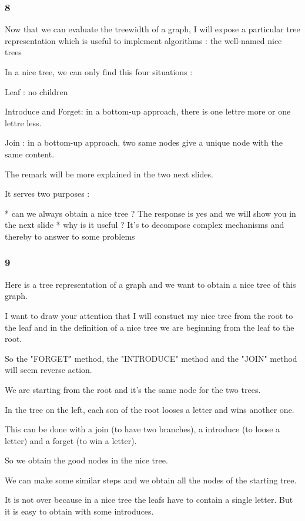 \documentclass[a4paper, 11pt,french]{article}
\begin{document}
\subsubsection*{ 8}

Now that we can evaluate the treewidth of a graph, I will expose a particular tree representation which is useful to implement algorithms : the well-named nice  trees

In a nice tree, we can only find this four situations : 

Leaf : no children

Introduce and Forget: in a bottom-up approach, there is one lettre more or one lettre less.

Join : in a bottom-up approach, two same nodes give a unique node with the same content.

The remark will be more explained in the two next slides. 

It serves two purposes : 

* can we always obtain a nice tree ? The response is yes and we will show you in the next slide
* why is it useful ? It's to decompose complex mechanisms and thereby to answer to some problems

\subsubsection*{ 9}

Here is a tree representation of a graph and we want to obtain a nice tree of this graph.

I want to draw your attention that I will constuct my nice tree from the root to the leaf and in the definition of a nice tree we are beginning from the leaf to the root.

So the "FORGET" method, the "INTRODUCE" method  and the "JOIN" method will seem reverse action.

We are starting from the root and it's the same node for the two trees.

In the tree on the left, each son of the root looses a letter and wins another one.

 This can be done with a join (to have two branches), a introduce (to loose a letter) and a forget (to win a letter). 
 
 So we obtain the good nodes in the nice tree.

We can make some similar steps and we obtain all the nodes of the starting tree.

It is not over because in a nice tree the leafs have to contain a single letter. But it is easy  to obtain with some introduces.
\end{document}

